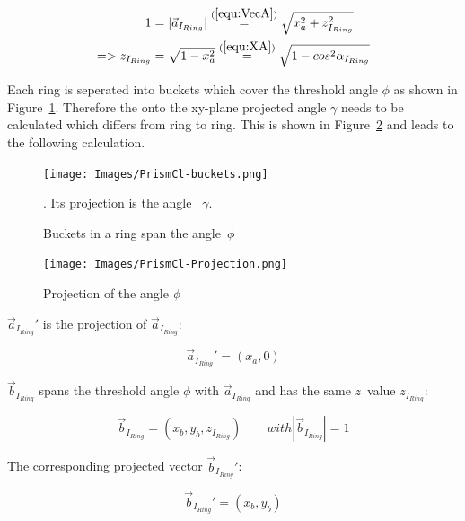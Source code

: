 \documentclass[../ClassicThesis.tex]{subfiles}
\begin{document}
\begin{equation}
\label{equ:ZIRing}
\begin{split}
    1 & = \vert \vec{a}_{I_{Ring}} \vert \stackrel{(\ref{equ:VecA})}{=} \sqrt{ x_{a}^{2} + z_{I_{Ring}}^{2} } \\
    => z_{I_{Ring}} & = \sqrt{1 - x_{a}^{2}}
    \stackrel{(\ref{equ:XA})}{=} \sqrt{1 - cos^{2}{{\alpha}_{I_{Ring}}}}
\end{split}
\end{equation}


Each ring is seperated into buckets which cover the threshold angle $\phi$ as shown in Figure~\ref{fig:PrismCl-buckets}. Therefore the onto the xy-plane projected angle $\gamma$ needs to be calculated which differs from ring to ring. This is shown in Figure~\ref{fig:projection} and leads to the following calculation.

\begin{figure}
    \texttt{[image: Images/PrismCl-buckets.png]}
    \caption{Buckets in a ring span the angle~$\phi$}. Its projection is the angle~ $\gamma$.
    \label{fig:PrismCl-buckets}
\end{figure}


\begin{figure}
    \texttt{[image: Images/PrismCl-Projection.png]}
    \caption{Projection of the angle $\protect\phi$}
    \label{fig:projection}
\end{figure}


$ \vec{a}_{I_{Ring}}' $ is the projection of $\vec{a}_{I_{Ring}} $:


\begin{equation}
    \label{equ:VecAStrich}
    \vec{a}_{I_{Ring}}' = (x_{a}, 0)
\end{equation}

$ \vec{b}_{I_{Ring}} $ spans the threshold angle $\phi$ with $ \vec{a}_{I_{Ring}} $ and has the same $z$~value $z_{I_{Ring}}$:

\begin{equation}
    \vec{b}_{I_{Ring}} = (x_{b}, y_{b}, z_{I_{Ring}}) \qquad with | \vec{b}_{I_{Ring}}| = 1
    \label{equ:VecB}
\end{equation}

The corresponding projected vector $ \vec{b}_{I_{Ring}}' $:

\begin{equation}
    \vec{b}_{I_{Ring}}' = (x_{b}, y_{b})
    \label{equ:VecBStrich}
\end{equation}
\end{document}
